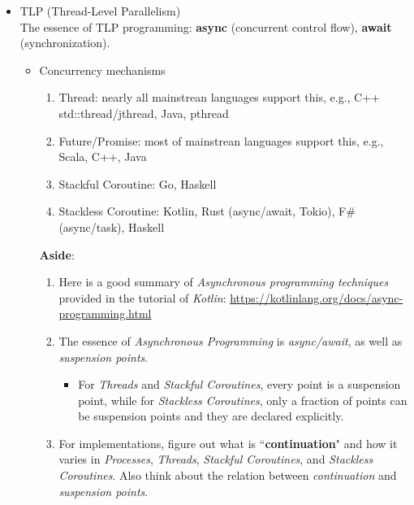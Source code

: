 \documentclass{article}
\begin{document}
\begin{itemize}
    \item TLP (Thread-Level Parallelism)\\
    The essence of TLP programming: \textbf{async} (concurrent control flow), \textbf{await} (synchronization).
    \begin{itemize}
        \item Concurrency mechanisms
        \begin{enumerate}
            \item Thread: nearly all mainstrean languages support this, e.g., C++ std::thread/jthread, Java, pthread
            \item Future/Promise: most of mainstrean languages support this,  e.g., Scala, C++, Java
            \item Stackful Coroutine: Go, Haskell
            \item Stackless Coroutine: Kotlin, Rust (async/await, Tokio), F\# (async/task), Haskell
        \end{enumerate}
        \textbf{Aside}:
        \begin{enumerate}
                \item Here is a good summary of \emph{Asynchronous programming techniques} provided in the tutorial of \emph{Kotlin}:
            \href{https://kotlinlang.org/docs/async-programming.html}{https://kotlinlang.org/docs/async-programming.html}
            \item The essence of \emph{Asynchronous Programming} is \emph{async/await}, as well as \emph{suspension points}.
            \begin{itemize}
                \item For \emph{Threads} and \emph{Stackful Coroutines}, every point is a suspension point, while for \emph{Stackless Coroutines}, only a fraction of points can be suspension points and they are declared explicitly.
            \end{itemize}
            \item For implementations, figure out what is ``\textbf{continuation}" and how it varies in \emph{Processes}, \emph{Threads}, \emph{Stackful Coroutines}, and \emph{Stackless Coroutines}.
            Also think about the relation between \emph{continuation} and \emph{suspension points}.
        \end{enumerate}


\end{itemize}
\end{itemize}
\end{document}
